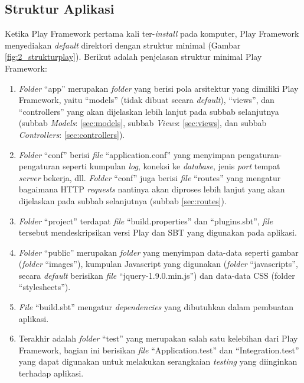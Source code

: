 \subsection{Struktur Aplikasi}
\label{sec:struktur_aplikasi}
Ketika Play Framework pertama kali ter-\textit{install} pada komputer, Play Framework menyediakan \textit{default} direktori dengan struktur minimal (Gambar \ref{fig:2_strukturplay}). Berikut adalah penjelasan struktur minimal Play Framework:
\begin{enumerate}
	\item \textit{Folder} ``app'' merupakan \textit{folder} yang berisi pola arsitektur yang dimiliki Play Framework, yaitu ``models'' (tidak dibuat secara \textit{default}), ``views'', dan ``controllers'' yang akan dijelaskan lebih lanjut pada subbab selanjutnya (subbab \textit{Models}: \ref{sec:models}, subbab \textit{Views}: \ref{sec:views}, dan subbab \textit{Controllers}: \ref{sec:controllers}).
	\item \textit{Folder} ``conf'' berisi \textit{file} ``application.conf'' yang menyimpan pengaturan-pengaturan seperti kumpulan \textit{log}, koneksi ke \textit{database}, jenis \textit{port} tempat \textit{server} bekerja, dll. \textit{Folder} ``conf'' juga berisi \textit{file} ``routes'' yang mengatur bagaimana HTTP \textit{requests} nantinya akan diproses lebih lanjut yang akan dijelaskan pada subbab selanjutnya (subbab \ref{sec:routes}).
	\item \textit{Folder} ``project'' terdapat \textit{file} ``build.properties'' dan ``plugins.sbt'', \textit{file} tersebut mendeskripsikan versi Play dan SBT yang digunakan pada aplikasi.
	\item \textit{Folder} ``public'' merupakan \textit{folder} yang menyimpan data-data seperti gambar (\textit{folder} ``images''), kumpulan Javascript yang digunakan (\textit{folder} ``javascripts'', secara \textit{default} berisikan \textit{file} ``jquery-1.9.0.min.js'') dan data-data CSS (folder ``stylesheets'').
	\item \textit{File} ``build.sbt'' mengatur \textit{dependencies} yang dibutuhkan dalam pembuatan aplikasi.
	\item Terakhir adalah \textit{folder} ``test'' yang merupakan salah satu kelebihan dari Play Framework, bagian ini berisikan \textit{file} ``Application.test'' dan ``Integration.test'' yang dapat digunakan untuk melakukan serangkaian \textit{testing} yang diinginkan terhadap aplikasi.
\end{enumerate}
     

